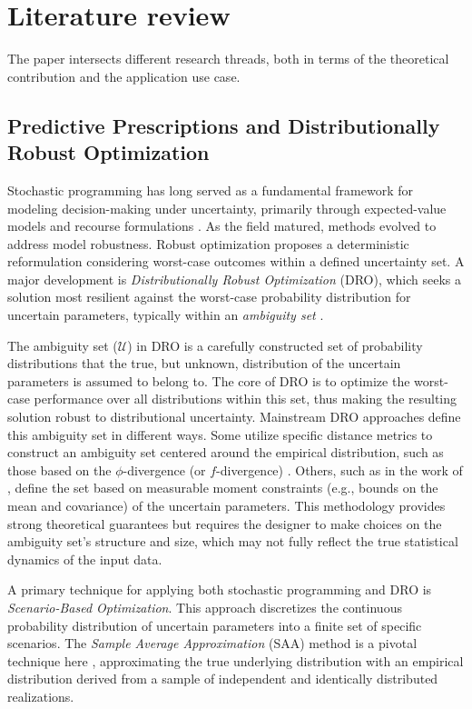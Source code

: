 \documentclass[poms,final,nonblindrev]{poms1_V1} %
\begin{document}
\section{Literature review} \label{Sec:literature}

The paper intersects different research threads, both in terms of the theoretical contribution and the application use case.

\subsection{Predictive Prescriptions and Distributionally Robust Optimization}

Stochastic programming has long served as a fundamental framework for modeling decision-making under uncertainty, primarily through expected-value models and recourse formulations \citep{D55,B55}. As the field matured, methods evolved to address model robustness. Robust optimization \citep{BN98,BS04} proposes a deterministic reformulation considering worst-case outcomes within a defined uncertainty set. A major development is {\it Distributionally Robust Optimization} (DRO), which seeks a solution most resilient against the worst-case probability distribution for uncertain parameters, typically within an {\it ambiguity set} \citep{DY10}.

The ambiguity set ($\mathcal{U}$) in DRO is a carefully constructed set of probability distributions that the true, but unknown, distribution of the uncertain parameters is assumed to belong to. The core of DRO is to optimize the worst-case performance over all distributions within this set, thus making the resulting solution robust to distributional uncertainty. Mainstream DRO approaches define this ambiguity set in different ways. Some utilize specific distance metrics to construct an ambiguity set centered around the empirical distribution, such as those based on the $\phi$-divergence (or $f$-divergence) \citep{BK19}. Others, such as in the work of \citet{EK17}, define the set based on measurable moment constraints (e.g., bounds on the mean and covariance) of the uncertain parameters. This methodology provides strong theoretical guarantees but requires the designer to make choices on the ambiguity set's structure and size, which may not fully reflect the true statistical dynamics of the input data.

A primary technique for applying both stochastic programming and DRO is {\it Scenario-Based Optimization}. This approach discretizes the continuous probability distribution of uncertain parameters into a finite set of specific scenarios. The {\it Sample Average Approximation} (SAA) method is a pivotal technique here \citep{SH98}, approximating the true underlying distribution with an empirical distribution derived from a sample of independent and identically distributed realizations.
\end{document}
